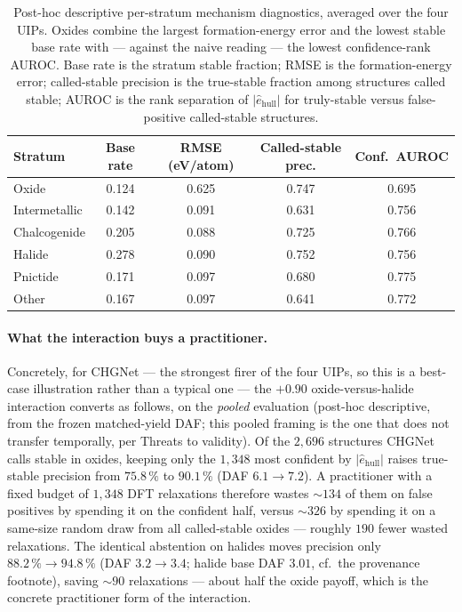 \documentclass[11pt]{article}
\begin{document}
\begin{table}[t]
  \centering
  \caption{Post-hoc descriptive per-stratum mechanism diagnostics, averaged over the four UIPs.
  Oxides combine the largest formation-energy error and the lowest stable base rate with ---
  against the naive reading --- the lowest confidence-rank AUROC. Base rate is the
  stratum stable fraction; RMSE is the formation-energy error; called-stable precision is the
  true-stable fraction among structures called stable; AUROC is the rank separation of
  $|\hat{e}_{\mathrm{hull}}|$ for truly-stable versus false-positive called-stable structures.}
  \label{tab:mechanism}
  \begin{tabular}{lcccc}
    \toprule
    Stratum & Base rate & RMSE (eV/atom) & Called-stable prec. & Conf.\ AUROC \\
    \midrule
    Oxide          & 0.124 & 0.625 & 0.747 & 0.695 \\
    Intermetallic  & 0.142 & 0.091 & 0.631 & 0.756 \\
    Chalcogenide   & 0.205 & 0.088 & 0.725 & 0.766 \\
    Halide         & 0.278 & 0.090 & 0.752 & 0.756 \\
    Pnictide       & 0.171 & 0.097 & 0.680 & 0.775 \\
    Other          & 0.167 & 0.097 & 0.641 & 0.772 \\
    \bottomrule
  \end{tabular}
\end{table}

\paragraph{What the interaction buys a practitioner.} Concretely, for CHGNet --- the strongest
firer of the four UIPs, so this is a best-case illustration rather than a typical one --- the
$+0.90$ oxide-versus-halide interaction converts as follows, on the \emph{pooled} evaluation
(post-hoc descriptive, from the frozen matched-yield DAF; this pooled framing is the one that
does not transfer temporally, per Threats to validity). Of the $2{,}696$ structures CHGNet
calls stable in oxides, keeping only the
$1{,}348$ most confident by $|\hat{e}_{\mathrm{hull}}|$ raises true-stable precision from
$75.8\,\%$ to $90.1\,\%$ (DAF $6.1 \to 7.2$). A practitioner with a fixed budget of $1{,}348$
DFT relaxations therefore wastes $\sim\!134$ of them on false positives by spending it on the
confident half, versus $\sim\!326$ by spending it on a same-size random draw from all
called-stable oxides --- roughly $190$ fewer wasted relaxations. The identical abstention on
halides moves precision only $88.2\,\% \to 94.8\,\%$ (DAF $3.2 \to 3.4$; halide base DAF $3.01$,
cf.\ the provenance footnote), saving $\sim\!90$ relaxations --- about half the oxide payoff,
which is the concrete practitioner form of the interaction.
\end{document}
